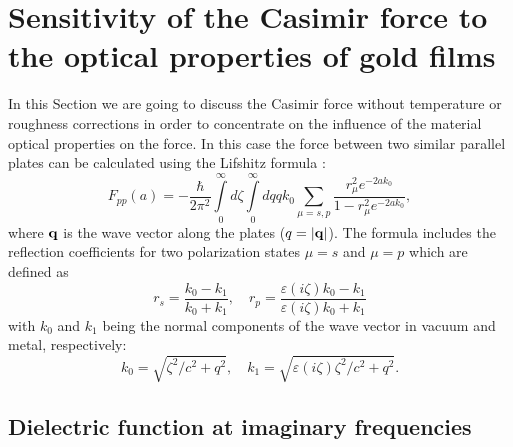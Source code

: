 \documentclass[prb]{revtex4}%
\begin{document}
\section{\label{Sec4} Sensitivity of the Casimir force to the optical properties of gold films}

In this Section we are going to discuss the Casimir force without
temperature or roughness corrections in order to concentrate on the
influence of the material optical properties on the force. In this
case the force between two similar parallel plates can be calculated
using the Lifshitz formula \cite{LP9}:
%
\begin{equation}
F_{pp}\left( a\right) =-\frac{\hbar}{2\pi^2
}\int\limits_{0}^{\infty}d\zeta\int\limits_{0}^{\infty
}dqqk_{0}\sum_{\mu=s,p}\frac{r_{\mu}^2e^{-2ak_0}}{1-r_{\mu}^2e^{-2ak_0}},
\label{Fpp}
\end{equation}
%
\noindent where ${\bf q}$ is the wave vector along the plates
($q=\left| {\bf q}\right| $). The formula includes the reflection
coefficients for two polarization states $\mu=s$ and $\mu=p$ which
are defined as
%
\begin{equation}
r_{s}=\frac{k_{0}-k_{1}}{k_{0}+k_{1}},\quad r_{p}=\frac{\varepsilon
\left( i\zeta \right) k_{0}-k_{1}}{\varepsilon \left( i\zeta \right)
k_{0}+k_{1}}  \label{rsp}
\end{equation}
%
\noindent with $k_{0}$ and $k_{1}$ being the normal components of
the wave vector in vacuum and metal, respectively:
%
\begin{equation}
k_{0}=\sqrt{\zeta^{2}/c^{2}+q^{2}},\quad k_{1}=\sqrt{\varepsilon
\left( i\zeta\right) \zeta^{2}/c^{2}+q^{2}}.  \label{k01}
\end{equation}


\subsection{\label{Sec4A}Dielectric function at imaginary frequencies}
\end{document}
